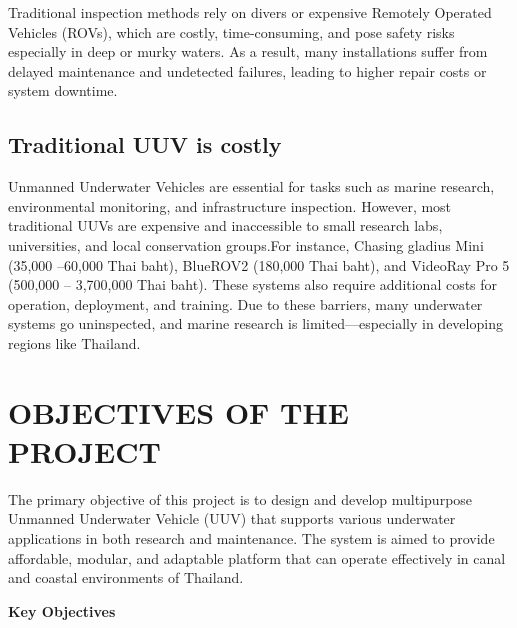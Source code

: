 Traditional inspection methods rely on divers or expensive Remotely
Operated Vehicles (ROVs), which are costly, time-consuming, and pose safety risks especially in deep or murky waters. As a result, many installations suffer from delayed maintenance and undetected failures, leading to higher repair costs or system downtime.

\subsection{Traditional UUV is costly}

Unmanned Underwater Vehicles are essential for tasks such as marine
research, environmental monitoring, and infrastructure inspection. However, most traditional UUVs are expensive and inaccessible to small research labs, universities, and local conservation groups.For instance, Chasing gladius Mini (35,000 –60,000 Thai baht), BlueROV2 (180,000 Thai baht), and VideoRay Pro 5 (500,000 – 3,700,000 Thai baht). These systems also require additional costs for operation, deployment, and training. Due to these barriers, many underwater systems go uninspected, and marine research is limited—especially in developing regions like Thailand.


\section{OBJECTIVES OF THE PROJECT}

The primary objective of this project is to design and develop multipurpose Unmanned Underwater Vehicle (UUV) that supports various underwater applications in both research and maintenance. The system is aimed to provide affordable, modular, and adaptable platform that can operate effectively in canal and coastal environments of Thailand. 

\textbf{Key Objectives}

